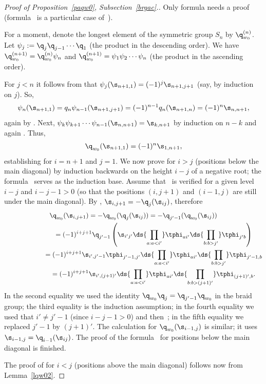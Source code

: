 \begin{proof}[Proof  of Proposition~\ref{paqw0}, Subsection~\ref{brgac}.] %
Only formula  needs a proof (formula~
is a particular case of~).


For a moment, denote the longest element
of the symmetric group $S_n$ by $\q_{w_0}^{(n)}$. Let $\psi_j:=\q_j\q_{j-1}\cdots\q_1$ (the product in the descending order).
We have $\q_{w_0}^{(n+1)}=\q_{w_0}^{(n)}\psi_n$ and  $\q_{w_0}^{(n+1)}=\psi_1\psi_2\cdots\psi_n$ (the product in the
ascending order).


For $j<n$ it follows from  that $\psi_j (\s_{n+1,1})=(-1)^j\s_{n+1,j+1}$ (say, by induction on $j$). So,
\begin{gather*}\psi_n(\s_{n+1,1})=q_n\psi_{n-1} (\s_{n+1,j+1})=(-1)^{n-1}q_n(\s_{n+1,n})=(-1)^{n}\s_{n,n+1}  ,\end{gather*}
again by . Next, $\psi_k\psi_{k+1}\cdots\psi_{n-1}(\s_{n,n+1})=\s_{k,n+1}$ by induction on $n-k$ and
again . Thus,
\begin{gather}\label{binh}
\q_{w_0}(\s_{n+1,1})=(-1)^n \s_{1,n+1} ,
\end{gather}
establishing  for $i=n+1$ and $j=1$. We now prove  for $i>j$ (positions below the main diagonal) by induction backwards
on the height $i-j$ of a negative root;  the formula~ serves as the induction base. Assume that~
is verif\/ied for a given level $i-j$ and $i-j-1>0$ (so that the positions $(i,j+1)$ and $(i-1,j)$ are still under the main
diagonal). By , $\s_{i,j+1}=-\q_j(\s_{ij})$, therefore
\begin{gather*}\q_{w_0}(\s_{i,j+1}) = -\q_{w_0}(\q_j(\s_{ij}))=-\q_{j'-1}(\q_{w_0}(\s_{ij})) \\
\phantom{\q_{w_0}(\s_{i,j+1})}{}  = (-1)^{i+j+1} \q_{j'-1}\left(\s_{i'j'}\ds{\prod_{a:a<i'}}\tphi_{ai'}  \ds{\prod_{b:b>j'}}\tphi_{j'b}\right)\\
\phantom{\q_{w_0}(\s_{i,j+1})}{} = (-1)^{i+j+1}\s_{i',j'-1}\tphi_{j'-1,j'}\ds{\prod_{a:a<i'}}\tphi_{ai'}  \ds{\prod_{b:b>j'}}\tphi_{j'-1,b}\\
\phantom{\q_{w_0}(\s_{i,j+1})}{} = (-1)^{i+j+1}\s_{i',(j+1)'}\ds{\prod_{a:a<i'}}\tphi_{ai'}\ds{\prod_{b:b>(j+1)'}}\tphi_{(j+1)',b}  .
\end{gather*}
In the second equality we used the identity $\q_{w_0}\q_j=\q_{j'-1}\q_{w_0}$ in the braid group; the third equality is the
induction assumption; in the fourth equality we used that $i'\neq j'-1$ (since $i-j-1>0$) and then~; in the f\/ifth equality we
replaced $j'-1$ by $(j+1)'$. The calculation for $\q_{w_0}(\s_{i-1,j})$ is similar; it uses $\s_{i-1,j}=\q_{i-1}(\s_{ij})$.
The proof of the formula~ for positions below the main diagonal is f\/inished.


The proof of   for $i<j$ (positions above the main diagonal) follows now from Lem\-ma~\ref{lqw02}. %
\end{proof}

